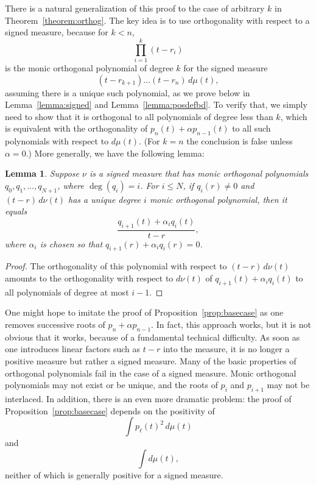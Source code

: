 \documentclass{jams-l}
\theoremstyle{plain}
\newtheorem{lemma}[theorem]{Lemma}
\numberwithin{theorem}{section}
\theoremstyle{definition}
\numberwithin{equation}{section}
\begin{document}
There is a natural generalization of this proof to the case of
arbitrary $k$ in Theorem~\ref{theorem:orthog}.  The key idea is to
use orthogonality with respect to a signed measure, because for
$k<n$,
$$
\prod_{i=1}^k (t-r_i)
$$
is the monic orthogonal polynomial of degree $k$ for the signed
measure
$$
(t-r_{k+1})\dots(t-r_n) \, d\mu(t),
$$
assuming there is a unique such polynomial, as we prove below in
Lemma~\ref{lemma:signed} and Lemma~\ref{lemma:posdefbd}. To verify
that, we simply need to show that it is orthogonal to all
polynomials of degree less than $k$, which is equivalent with the
orthogonality of $p_n(t)+\alpha p_{n-1}(t)$ to all such
polynomials with respect to $d\mu(t)$. (For $k=n$ the conclusion
is false unless $\alpha=0$.)  More generally, we have the
following lemma:

\begin{lemma} \label{lemma:signedmeasure}
Suppose $\nu$ is a signed measure that has monic orthogonal
polynomials $q_0,q_1,\dots,q_{N+1}$, where $\deg(q_i) = i$. For $i
\le N$, if $q_i(r) \ne 0$ and $(t-r) \, d\nu(t)$ has a unique
degree $i$ monic orthogonal polynomial, then it equals
$$
\frac{q_{i+1}(t) + \alpha_i q_i(t)}{t-r},
$$
where $\alpha_i$ is chosen so that $q_{i+1}(r) + \alpha_i q_i(r) =
0$.
\end{lemma}

\begin{proof}
The orthogonality of this polynomial with respect to $(t-r)\,
d\nu(t)$ amounts to the orthogonality with respect to $d\nu(t)$ of
$q_{i+1}(t) + \alpha_i q_i(t)$ to all polynomials of degree at
most $i-1$.
\end{proof}

One might hope to imitate the proof of
Proposition~\ref{prop:basecase} as one removes successive roots of
$p_n+\alpha p_{n-1}$. In fact, this approach works, but it is not
obvious that it works, because of a fundamental technical
difficulty. As soon as one introduces linear factors such as $t-r$
into the measure, it is no longer a positive measure but rather a
signed measure.  Many of the basic properties of orthogonal
polynomials fail in the case of a signed measure.  Monic
orthogonal polynomials may not exist or be unique, and the roots
of $p_i$ and $p_{i+1}$ may not be interlaced. In addition, there
is an even more dramatic problem: the proof of
Proposition~\ref{prop:basecase} depends on the positivity of
$$
\int p_\ell(t)^2 \, d\mu(t)
$$
and
$$
\int d\mu(t),
$$
neither of which is generally positive for a signed measure.
\end{document}
